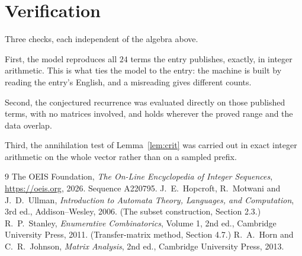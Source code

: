 \documentclass[11pt,a4paper]{article}
\theoremstyle{plain}
\theoremstyle{definition}
\begin{document}
\section{Verification}

Three checks, each independent of the algebra above.

First, the model reproduces all $24$ terms the entry publishes, exactly, in integer
arithmetic. This is what ties the model to the entry: the machine is built by reading the
entry's English, and a misreading gives different counts.

Second, the conjectured recurrence was evaluated directly on those published terms, with no
matrices involved, and holds wherever the proved range and the data overlap.

Third, the annihilation test of Lemma~\ref{lem:crit} was carried out in exact integer
arithmetic on the whole vector rather than on a sampled prefix.

\begin{thebibliography}{9}
 The OEIS Foundation, \emph{The On-Line Encyclopedia of Integer
Sequences}, \url{https://oeis.org}, 2026. Sequence A220795.
 J.~E.~Hopcroft, R.~Motwani and J.~D.~Ullman, \emph{Introduction to Automata
Theory, Languages, and Computation}, 3rd ed., Addison--Wesley, 2006. (The subset
construction, Section 2.3.)
 R.~P.~Stanley, \emph{Enumerative Combinatorics}, Volume 1, 2nd ed.,
Cambridge University Press, 2011. (Transfer-matrix method, Section 4.7.)
 R.~A.~Horn and C.~R.~Johnson, \emph{Matrix Analysis}, 2nd ed., Cambridge
University Press, 2013.
\end{thebibliography}
\end{document}
